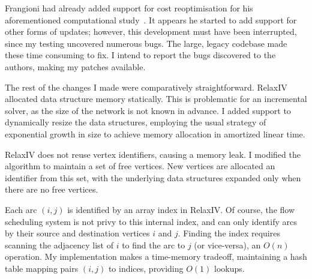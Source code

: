 
Frangioni had already added support for cost reoptimisation for his aforementioned computational study~\cite{Frangioni:2006}. It appears he started to add support for other forms of updates; however, this development must have been interrupted, since my testing uncovered numerous bugs. The large, legacy codebase made these time consuming to fix. I intend to report the bugs discovered to the authors, making my patches available.

The rest of the changes I made were comparatively straightforward. RelaxIV allocated data structure memory statically. This is problematic for an incremental solver, as the size of the network is not known in advance. I added support to dynamically resize the data structures, employing the usual strategy of exponential growth in size to achieve memory allocation in amortized linear time\footnotemark.

RelaxIV does not reuse vertex identifiers, causing a memory leak. I modified the algorithm to maintain a set of free vertices. New vertices are allocated an identifier from this set, with the underlying data structures expanded only when there are no free vertices.

Each arc $(i,j)$ is identified by an array index in RelaxIV. Of course, the flow scheduling system is not privy to this internal index, and can only identify arcs by their source and destination vertices $i$ and $j$. Finding the index requires scanning the adjacency list of $i$ to find the arc to $j$ (or vice-versa), an $O(n)$ operation. My implementation makes a time-memory tradeoff, maintaining a hash table mapping pairs $(i,j)$ to indices, providing $O(1)$ lookups.

